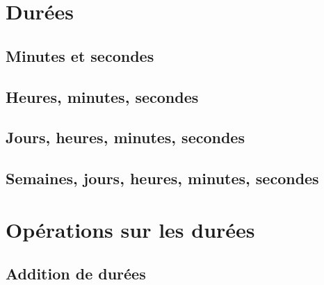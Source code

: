 \documentclass[11pt,a4paper]{article}
\begin{document}
\section{Durées}

\subsection{Minutes et secondes}



\subsection{Heures, minutes, secondes}




\subsection{Jours, heures, minutes, secondes}





\subsection{Semaines, jours, heures, minutes, secondes}






\section{Opérations sur les durées}

\subsection{Addition de durées}
\end{document}
